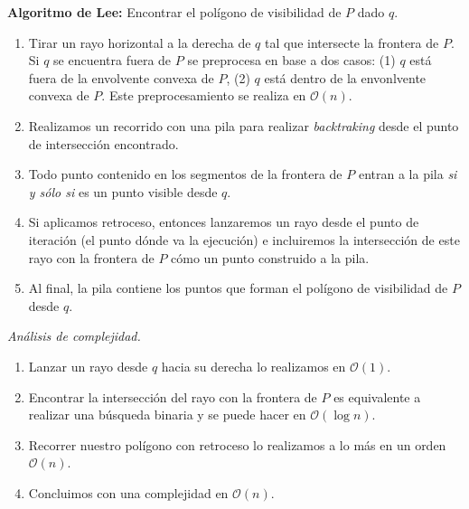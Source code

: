\textbf{Algoritmo de Lee:} Encontrar el polígono de visibilidad de $P$ dado $q$.
\begin{enumerate}
\item Tirar un rayo horizontal a la derecha de $q$ tal que intersecte la frontera de $P$. Si $q$ se encuentra fuera
  de $P$ se preprocesa en base a dos casos: (1) $q$ está fuera de la envolvente convexa de $P$, (2) $q$ está dentro
  de la envonlvente convexa de $P$. Este preprocesamiento se realiza en $\mathcal{O}(n)$.
\item Realizamos un recorrido con una pila para realizar \textit{backtraking} desde el punto de intersección encontrado.
\item Todo punto contenido en los segmentos de la frontera de $P$ entran a la pila \textit{si y sólo si} es un punto
  visible desde $q$.
\item Si aplicamos retroceso, entonces lanzaremos un rayo desde el punto de iteración (el punto dónde va la ejecución)
  e incluiremos la intersección de este rayo con la frontera de $P$ cómo un punto construido a la pila.
\item Al final, la pila contiene  los puntos que forman el polígono de visibilidad de $P$ desde $q$.
\end{enumerate}
\textit{Análisis de complejidad.}
\begin{enumerate}
\item Lanzar un rayo desde $q$ hacia su derecha lo realizamos en $\mathcal{O}(1)$.
\item Encontrar la intersección del rayo con la frontera de $P$ es equivalente a realizar una
  búsqueda binaria y se puede hacer en $\mathcal{O}(\log n)$.
\item Recorrer nuestro polígono con retroceso lo realizamos a lo más en un orden $\mathcal{O}(n)$.
\item Concluimos con una complejidad en $\mathcal{O}(n)$.
\end{enumerate}
